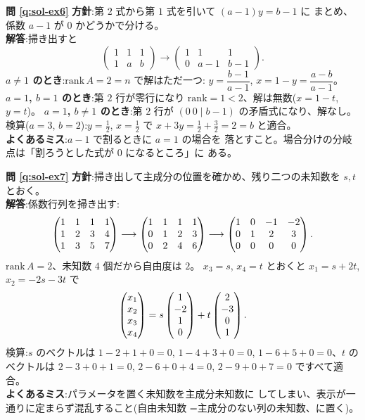 \bigskip
\noindent\textbf{問 \ref{q:sol-ex6}}\quad
\textbf{方針}:第 $2$ 式から第 $1$ 式を引いて $(a - 1)y = b - 1$ に
まとめ、係数 $a - 1$ が $0$ かどうかで分ける。\\
\textbf{解答}:掃き出すと
\[
\left(\begin{array}{cc|c} 1 & 1 & 1 \\ 1 & a & b \end{array}\right)
\longrightarrow
\left(\begin{array}{cc|c} 1 & 1 & 1 \\ 0 & a - 1 & b - 1 \end{array}\right).
\]
\textbf{$a \neq 1$ のとき}:$\mathrm{rank}\,A = 2 = n$ で解はただ一つ:
$y = \dfrac{b - 1}{a - 1}$, $x = 1 - y = \dfrac{a - b}{a - 1}$。
\textbf{$a = 1$, $b = 1$ のとき}:第 $2$ 行が零行になり
$\mathrm{rank} = 1 < 2$、解は無数($x = 1 - t$, $y = t$)。
\textbf{$a = 1$, $b \neq 1$ のとき}:第 $2$ 行が
$(0\ 0 \mid b - 1)$ の矛盾式になり、解なし。
検算($a = 3$, $b = 2$):$y = \frac{1}{2}$, $x = \frac{1}{2}$ で
$x + 3y = \frac{1}{2} + \frac{3}{2} = 2 = b$ と適合。\\
\textbf{よくあるミス}:$a - 1$ で割るときに $a = 1$ の場合を
落とすこと。場合分けの分岐点は「割ろうとした式が $0$ になるところ」に
ある。

\bigskip
\noindent\textbf{問 \ref{q:sol-ex7}}\quad
\textbf{方針}:掃き出して主成分の位置を確かめ、残り二つの未知数を
$s, t$ とおく。\\
\textbf{解答}:係数行列を掃き出す:
\[
\begin{pmatrix}1 & 1 & 1 & 1 \\ 1 & 2 & 3 & 4 \\ 1 & 3 & 5 & 7\end{pmatrix}
\longrightarrow
\begin{pmatrix}1 & 1 & 1 & 1 \\ 0 & 1 & 2 & 3 \\ 0 & 2 & 4 & 6\end{pmatrix}
\longrightarrow
\begin{pmatrix}1 & 0 & -1 & -2 \\ 0 & 1 & 2 & 3 \\ 0 & 0 & 0 & 0\end{pmatrix}.
\]
$\mathrm{rank}\,A = 2$、未知数 $4$ 個だから自由度は $2$。
$x_3 = s$, $x_4 = t$ とおくと $x_1 = s + 2t$, $x_2 = -2s - 3t$ で
\[
\begin{pmatrix}x_1 \\ x_2 \\ x_3 \\ x_4\end{pmatrix}
= s\begin{pmatrix}1 \\ -2 \\ 1 \\ 0\end{pmatrix} + t\begin{pmatrix}2 \\ -3 \\ 0 \\ 1\end{pmatrix}.
\]
検算:$s$ のベクトルは $1 - 2 + 1 + 0 = 0$, $1 - 4 + 3 + 0 = 0$,
$1 - 6 + 5 + 0 = 0$、$t$ のベクトルは $2 - 3 + 0 + 1 = 0$,
$2 - 6 + 0 + 4 = 0$, $2 - 9 + 0 + 7 = 0$ ですべて適合。\\
\textbf{よくあるミス}:パラメータを置く未知数を主成分未知数に
してしまい、表示が一通りに定まらず混乱すること(自由未知数
=主成分のない列の未知数、に置く)。

